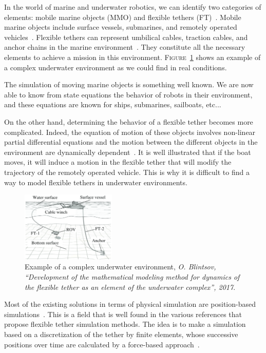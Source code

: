 In the world of marine and underwater robotics, we can identify two categories of elements: mobile marine objects (MMO) and flexible tethers (FT)~\cite{blintsov_development_2017}. Mobile marine objects include surface vessels, submarines, and remotely operated vehicles~\cite{fossen2011handbook}. Flexible tethers can represent umbilical cables, traction cables, and anchor chains in the marine environment~\cite{fossen2011handbook}. They constitute all the necessary elements to achieve a mission in this environment. \textsc{Figure}~\ref{fig:underwater_environment} shows an example of a complex underwater environment as we could find in real conditions.

The simulation of moving marine objects is something well known. We are now able to know from state equations the behavior of robots in their environment, and these equations are known for ships, submarines, sailboats, etc...~\cite{fossen2011handbook, jaulin2019mobile}

On the other hand, determining the behavior of a flexible tether becomes more complicated. Indeed, the equation of motion of these objects involves non-linear partial differential equations and the motion between the different objects in the environment are dynamically dependent~\cite{blintsov_development_2017}. It is well illustrated that if the boat moves, it will induce a motion in the flexible tether that will modify the trajectory of the remotely operated vehicle. This is why it is difficult to find a way to model flexible tethers in underwater environments.

\begin{figure}[!htb]
	\centering
	\includegraphics[width=0.4\textwidth]{imgs/underwater_environment.png}
	\caption{Example of a complex underwater environment, \textit{O.  Blintsov,  “Development  of  the  mathematical  modeling  method  for dynamics of the flexible tether as an element of the underwater complex”, 2017}.~\cite{blintsov_development_2017}}
	\label{fig:underwater_environment}
\end{figure}

Most of the existing solutions in terms of physical simulation are position-based simulations~\cite{bender_simulation_methods}. This is a field that is well found in the various references that propose flexible tether simulation methods. The idea is to make a simulation based on a discretization of the tether by finite elements, whose successive positions over time are calculated by a force-based approach~\cite{ellis_modeling, blintsov_development_2017,marshall,ganoni_unreal, koenemann_modeling_2017, prabhakar_dynamics_2005}.


